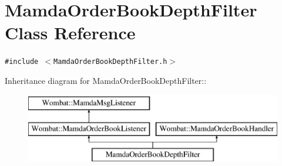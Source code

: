 \hypertarget{classMamdaOrderBookDepthFilter}{
\section{Mamda\-Order\-Book\-Depth\-Filter Class Reference}
\label{classMamdaOrderBookDepthFilter}
}
{\tt \#include $<$Mamda\-Order\-Book\-Depth\-Filter.h$>$}

Inheritance diagram for Mamda\-Order\-Book\-Depth\-Filter::\begin{figure}[H]
\begin{center}
\leavevmode
\includegraphics[height=3cm]{classMamdaOrderBookDepthFilter}
\end{center}
\end{figure}

